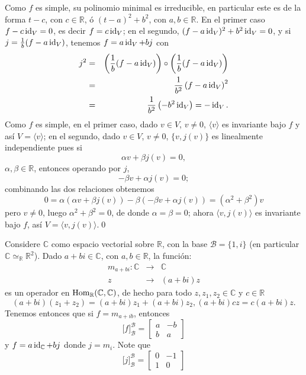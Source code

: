 \dem Como $f$ es simple, su polinomio minimal es irreducible, en particular este es de la forma $t-c$, con $c\in\mathbb{R}$, \'o $(t-a)^2+b^2$, con $a,b\in\mathbb{R}$. En el primer caso $f-c\operatorname{id}_V=0$, es decir $f=c\operatorname{id}_V$; en el segundo, $(f-a\operatorname{id}_V)^2+b^2\operatorname{id}_V=0$, y si $j=\frac{1}{b}(f-a\operatorname{id}_V)$, tenemos $f=a\operatorname{id}_V+bj$ con
\begin{eqnarray*}
j^2 & = & \left(\frac{1}{b}(f-a\operatorname{id}_V)\right)\circ\left(\frac{1}{b}(f-a\operatorname{id}_V)\right)\\
 & = & \frac{1}{b^2}\left(f-a\operatorname{id}_V\right)^2\\
 & = & \frac{1}{b^2}\left(-b^2\operatorname{id}_V\right)=-\operatorname{id}_V.
\end{eqnarray*}
Como $f$ es simple, en el primer caso, dado $v\in V$, $v\ne 0$, $\langle v\rangle$ es invariante bajo $f$ y as\'i $V=\langle v\rangle$; en el segundo, dado $v\in V$, $v\ne 0$, $\{v,j(v)\}$ es linealmente independiente pues si
\[
\alpha v+\beta j(v)=0,
\]
$\alpha,\beta\in\mathbb{R}$, entonces operando por $j$,
\[
-\beta v+\alpha j(v)=0;
\]
combinando las dos relaciones obtenemos
\[
0=\alpha\left(\alpha v+\beta j(v)\right)-\beta\left(-\beta v+\alpha j(v)\right)=(\alpha^2+\beta^2)v
\]
pero $v\ne 0$, luego $\alpha^2+\beta^2=0$, de donde $\alpha=\beta=0$; ahora $\langle v,j(v)\rangle$ es invariante bajo $f$, as\'i $V=\langle v,j(v)\rangle$.\qed

\begin{obs}
Considere $\mathbb{C}$ como espacio vectorial sobre $\mathbb{R}$, con la base $\mathcal{B}=\{1,i\}$ (en particular $\mathbb{C}\simeq_\mathbb{R}\mathbb{R}^2$). Dado $a+bi\in\mathbb{C}$, con $a,b\in\mathbb{R}$, la funci\'on:
\begin{eqnarray*}
m_{a+bi}:\mathbb{C} & \longrightarrow & \mathbb{C}\\
 z & \longrightarrow & (a+bi)z
\end{eqnarray*}
es un operador en $\operatorname{Hom}_{\mathbb{R}}(\mathbb{C},\mathbb{C})$, de hecho para todo $z,z_1,z_2\in\mathbb{C}$ y $c\in\mathbb{R}$
\[
(a+bi)\left(z_1+z_2\right)=(a+bi)z_1+(a+bi)z_2, (a+bi)cz=c(a+bi)z.
\]
Tenemos entonces que si $f=m_{a+ib}$, entonces
\[
\Big[f\Big]^\mathcal{B}_\mathcal{B}=\left[\begin{array}{rr} a & -b\\b & a\end{array}\right]
\]
y $f=a\operatorname{id}_\mathbb{C}+bj$ donde $j=m_i$. Note que
\[
\Big[j\Big]^\mathcal{B}_\mathcal{B}=\left[\begin{array}{rr} 0 & -1\\1 & 0\end{array}\right]
\]
\end{obs}


